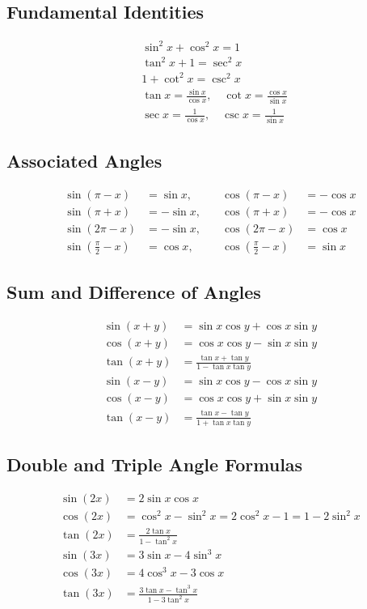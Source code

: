\documentclass[10pt, letterpaper]{report}
\begin{document}
\subsection*{Fundamental Identities}
\begin{align*}
&\sin^2 x + \cos^2 x = 1 \\
&\tan^2 x + 1 = \sec^2 x \\
&1 + \cot^2 x = \csc^2 x \\
&\tan x = \frac{\sin x}{\cos x},\quad \cot x = \frac{\cos x}{\sin x} \\
&\sec x = \frac{1}{\cos x},\quad \csc x = \frac{1}{\sin x}
\end{align*}

\subsection*{Associated Angles}
\begin{align*}
\sin(\pi - x) &= \sin x, & \cos(\pi - x) &= -\cos x \\
\sin(\pi + x) &= -\sin x,\quad &\cos(\pi + x) &= -\cos x \\
\sin(2\pi - x) &= -\sin x,\quad &\cos(2\pi - x) &= \cos x \\
\sin\left(\frac{\pi}{2}-x\right)&=\cos x,\quad &\cos\left(\frac{\pi}{2}-x\right) &= \sin x
\end{align*}

\subsection*{Sum and Difference of Angles}
\begin{align*}
\sin(x+y) &= \sin x\cos y + \cos x\sin y \\
\cos(x+y) &= \cos x\cos y - \sin x\sin y \\
\tan(x+y) &= \frac{\tan x + \tan y}{1 - \tan x\tan y} \\[6pt]
\sin(x-y) &= \sin x\cos y - \cos x\sin y \\
\cos(x-y) &= \cos x\cos y + \sin x\sin y \\
\tan(x-y) &= \frac{\tan x - \tan y}{1 + \tan x\tan y}
\end{align*}

\subsection*{Double and Triple Angle Formulas}
\begin{align*}
\sin(2x) &= 2\sin x\cos x \\
\cos(2x) &= \cos^2 x - \sin^2 x = 2\cos^2 x - 1 = 1 - 2\sin^2 x \\
\tan(2x) &= \frac{2\tan x}{1 - \tan^2 x}\\[8pt]
\sin(3x) &= 3\sin x - 4\sin^3 x \\
\cos(3x) &= 4\cos^3 x - 3\cos x \\
\tan(3x) &= \frac{3\tan x - \tan^3 x}{1 - 3\tan^2 x}
\end{align*}
\end{document}
